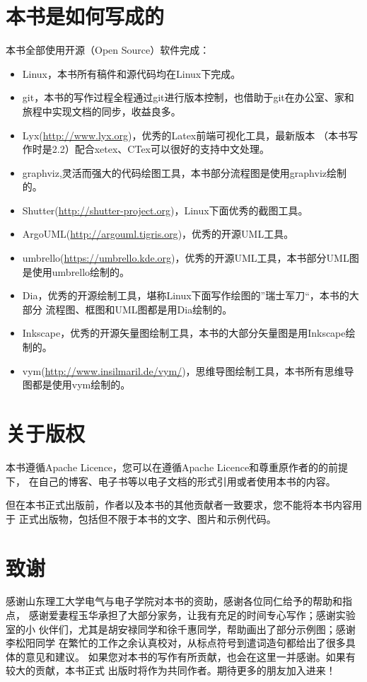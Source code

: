 \section*{本书是如何写成的}
本书全部使用开源（Open Source）软件完成：
\begin{itemize}
    \item Linux，本书所有稿件和源代码均在Linux下完成。
    \item git，本书的写作过程全程通过git进行版本控制，也借助于git在办公室、家和旅程中实现文档的同步，收益良多。
    \item Lyx(\url{http://www.lyx.org})，优秀的Latex前端可视化工具，最新版本
        （本书写作时是2.2）配合xetex、CTex可以很好的支持中文处理。
    \item graphviz,灵活而强大的代码绘图工具，本书部分流程图是使用graphviz绘制的。
    \item Shutter(\url{http://shutter-project.org})，Linux下面优秀的截图工具。
    \item ArgoUML(\url{http://argouml.tigris.org})，优秀的开源UML工具。
    \item umbrello(\url{https://umbrello.kde.org})，优秀的开源UML工具，本书部分UML图是使用umbrello绘制的。
    \item Dia，优秀的开源绘制工具，堪称Linux下面写作绘图的”瑞士军刀“，本书的大部分
        流程图、框图和UML图都是用Dia绘制的。
    \item Inkscape，优秀的开源矢量图绘制工具，本书的大部分矢量图是用Inkscape绘制的。
    \item vym(\url{http://www.insilmaril.de/vym/})，思维导图绘制工具，本书所有思维导图都是使用vym绘制的。
\end{itemize}

\section*{关于版权}
本书遵循Apache Licence，您可以在遵循Apache Licence和尊重原作者的的前提下，
在自己的博客、电子书等以电子文档的形式引用或者使用本书的内容。

但在本书正式出版前，作者以及本书的其他贡献者一致要求，您不能将本书内容用于
正式出版物，包括但不限于本书的文字、图片和示例代码。

\section*{致谢}
感谢山东理工大学电气与电子学院对本书的资助，感谢各位同仁给予的帮助和指点，
感谢爱妻程玉华承担了大部分家务，让我有充足的时间专心写作；感谢实验室的小
伙伴们，尤其是胡安禄同学和徐千惠同学，帮助画出了部分示例图；感谢李松阳同学
在繁忙的工作之余认真校对，从标点符号到遣词造句都给出了很多具体的意见和建议。
如果您对本书的写作有所贡献，也会在这里一并感谢。如果有较大的贡献，本书正式
出版时将作为共同作者。期待更多的朋友加入进来！

